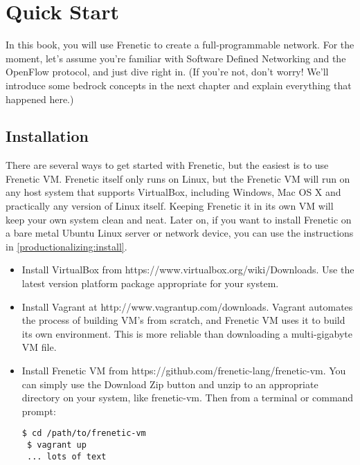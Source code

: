 
\chapter{Quick Start}

In this book, you will use Frenetic to create a full-programmable network.  For the moment, let's assume you're familiar with Software Defined Networking and the OpenFlow protocol, and just dive right in.  (If you're not, don't worry!  We'll introduce some bedrock concepts in the next chapter and explain everything that happened here.)  

\section{Installation}

There are several ways to get started with Frenetic, but the easiest is to use Frenetic VM.  Frenetic itself only runs on Linux, but the Frenetic VM will run on any host system that supports VirtualBox, including Windows, Mac OS X and practically any version of Linux itself.   Keeping Frenetic it in its own VM will keep your own system clean and neat.  Later on, if you want to install Frenetic on a bare metal Ubuntu Linux server or network device, you can use the instructions in \ref{productionalizing:install}.  

\begin{itemize}
\item Install VirtualBox from https://www.virtualbox.org/wiki/Downloads.  Use the latest version platform package appropriate for your system.  
\item Install Vagrant at http://www.vagrantup.com/downloads.  Vagrant automates the process of building VM's from scratch, and Frenetic VM uses it to build its own environment.  This is more reliable than downloading a multi-gigabyte VM file.   
\item Install Frenetic VM from https://github.com/frenetic-lang/frenetic-vm.  You can simply use the Download Zip button and unzip to an appropriate directory on your system, like frenetic-vm.  Then from a terminal or command prompt:

\begin{lstlisting}[style=BashInputStyle]
 $ cd /path/to/frenetic-vm
 $ vagrant up
 ... lots of text 
\end{lstlisting}
\end{itemize}

